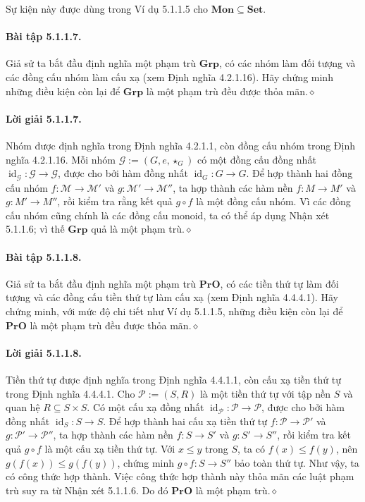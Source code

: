 Sự kiện này được dùng trong Ví dụ 5.1.1.5 cho $\mathbf{Mon}\subseteq\mathbf{Set}$.
\paragraph{Bài tập 5.1.1.7.} Giả sử ta bắt đầu định nghĩa một phạm trù $\mathbf{Grp}$, có các nhóm làm đối tượng và các đồng cấu nhóm làm cấu xạ (xem Định nghĩa 4.2.1.16). Hãy chứng minh những điều kiện còn lại để $\mathbf{Grp}$ là một phạm trù đều được thỏa mãn.\hfill$\diamond$
\paragraph{Lời giải 5.1.1.7.} Nhóm được định nghĩa trong Định nghĩa 4.2.1.1, còn đồng cấu nhóm trong Định nghĩa 4.2.1.16. Mỗi nhóm $\mathcal G:=(G,e,\star_G)$ có một đồng cấu đồng nhất $\operatorname{id}_{\mathcal G}:\mathcal G\to\mathcal G$, được cho bởi hàm đồng nhất $\operatorname{id}_G:G\to G$. Để hợp thành hai đồng cấu nhóm $f:\mathcal M\to\mathcal M'$ và $g:\mathcal M'\to\mathcal M''$, ta hợp thành các hàm nền $f:M\to M'$ và $g:M'\to M''$, rồi kiểm tra rằng kết quả $g\circ f$ là một đồng cấu nhóm. Vì các đồng cấu nhóm cũng chính là các đồng cấu monoid, ta có thể áp dụng Nhận xét 5.1.1.6; vì thế $\mathbf{Grp}$ quả là một phạm trù.\hfill$\diamond$
\paragraph{Bài tập 5.1.1.8.} Giả sử ta bắt đầu định nghĩa một phạm trù $\mathbf{PrO}$, có các tiền thứ tự làm đối tượng và các đồng cấu tiền thứ tự làm cấu xạ (xem Định nghĩa 4.4.4.1). Hãy chứng minh, với mức độ chi tiết như Ví dụ 5.1.1.5, những điều kiện còn lại để $\mathbf{PrO}$ là một phạm trù đều được thỏa mãn.\hfill$\diamond$
\paragraph{Lời giải 5.1.1.8.} Tiền thứ tự được định nghĩa trong Định nghĩa 4.4.1.1, còn cấu xạ tiền thứ tự trong Định nghĩa 4.4.4.1. Cho $\mathcal P:=(S,R)$ là một tiền thứ tự với tập nền $S$ và quan hệ $R\subseteq S\times S$. Có một cấu xạ đồng nhất $\operatorname{id}_{\mathcal P}:\mathcal P\to\mathcal P$, được cho bởi hàm đồng nhất $\operatorname{id}_S:S\to S$. Để hợp thành hai cấu xạ tiền thứ tự $f:\mathcal P\to\mathcal P'$ và $g:\mathcal P'\to\mathcal P''$, ta hợp thành các hàm nền $f:S\to S'$ và $g:S'\to S''$, rồi kiểm tra kết quả $g\circ f$ là một cấu xạ tiền thứ tự. Với $x\leq y$ trong $S$, ta có $f(x)\leq f(y)$, nên $g(f(x))\leq g(f(y))$, chứng minh $g\circ f:S\to S''$ bảo toàn thứ tự. Như vậy, ta có công thức hợp thành. Việc công thức hợp thành này thỏa mãn các luật phạm trù suy ra từ Nhận xét 5.1.1.6. Do đó $\mathbf{PrO}$ là một phạm trù.\hfill$\diamond$
